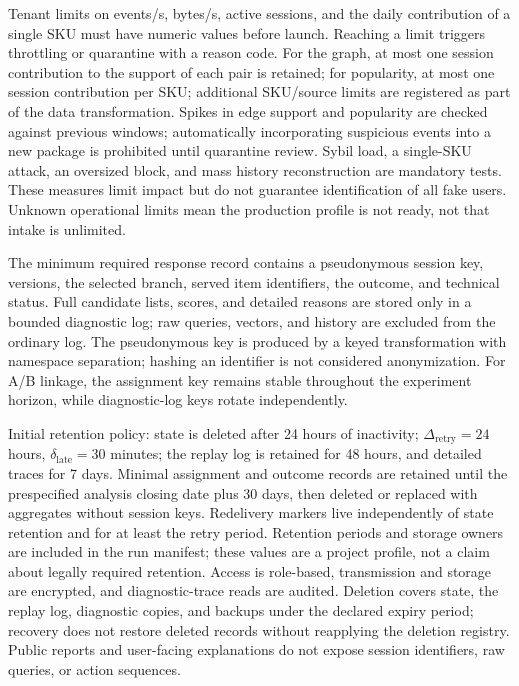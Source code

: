 \documentclass[12pt,a4paper]{article}
\theoremstyle{plainru}
\begin{document}
Tenant limits on events/s, bytes/s, active sessions, and the daily contribution
of a single SKU must have numeric values before launch. Reaching
a limit triggers throttling or quarantine with a reason code.
For the graph, at most one session contribution to the support
of each pair is retained; for popularity, at most one session contribution per SKU;
additional SKU/source limits are registered as part of
the data transformation. Spikes in edge support and popularity are checked against
previous windows; automatically incorporating suspicious events
into a new package is prohibited until quarantine review. Sybil load,
a single-SKU attack, an oversized block, and mass history reconstruction are mandatory
tests. These measures limit impact but do not guarantee
identification of all fake users. Unknown operational
limits mean the production profile is not ready, not that intake is unlimited.

The minimum required response record contains a pseudonymous session
key, versions, the selected branch, served item identifiers,
the outcome, and technical status. Full candidate lists, scores, and detailed
reasons are stored only in a bounded diagnostic log;
raw queries, vectors, and history are excluded from the ordinary log.
The pseudonymous key is produced by a keyed transformation with namespace
separation; hashing an identifier is not considered anonymization.
For A/B linkage, the assignment key remains stable throughout the
experiment horizon, while diagnostic-log keys rotate independently.

Initial retention policy: state is deleted after 24 hours
of inactivity; $\Delta_{\mathrm{retry}}=24$ hours,
$\delta_{\mathrm{late}}=30$ minutes; the replay log is retained for 48 hours,
and detailed traces for 7 days. Minimal assignment and outcome records
are retained until the prespecified analysis closing date plus 30 days,
then deleted or replaced with aggregates without session keys.
Redelivery markers live independently of state retention and for at least
the retry period. Retention periods and storage owners are included
in the run manifest; these values are a project profile, not
a claim about legally required retention. Access is role-based,
transmission and storage are encrypted, and diagnostic-trace reads are audited.
Deletion covers state, the replay log, diagnostic copies,
and backups under the declared expiry period; recovery
does not restore deleted records without reapplying the deletion registry.
Public reports and user-facing explanations do not expose
session identifiers, raw queries, or action sequences.
\end{document}
